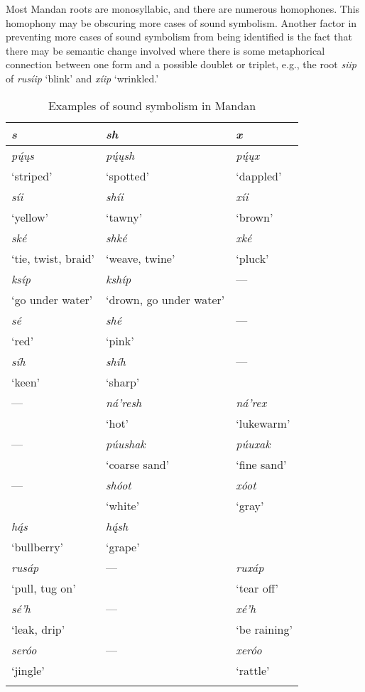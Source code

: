 Most Mandan roots are monosyllabic, and there are numerous homophones. This homophony may be obscuring more cases of sound symbolism. Another factor in preventing more cases of sound symbolism from being identified is the fact that there may be semantic change involved where there is some metaphorical connection between one form and a possible doublet or triplet, e.g., the root \textit{siip} of \textit{rusíip}  `blink' and \textit{xíip} `wrinkled.'

\begin{table}
\caption{Examples of sound symbolism in Mandan}\label{soundsymbolismtable}
\begin{tabular}{lll}
\lsptoprule
\textit{\textbf{s}}&\textit{\textbf{sh}}&\textit{\textbf{x}}\\
\midrule
\textit{pų́ųs}&\textit{pų́ųsh}&\textit{pų́ųx}\\
`striped'&`spotted'&`dappled'\\
\tablevspace
\textit{síi}&\textit{shíi}&\textit{xíi}\\
`yellow'&`tawny'&`brown'\\
\tablevspace
\textit{ské}&\textit{shké}&\textit{xké}\\
`tie, twist, braid'&`weave, twine'&`pluck'\\
\tablevspace
\textit{ksíp}&\textit{kshíp}&---\\
`go under water'&`drown, go under water'&~\\
\tablevspace
\textit{sé}&\textit{shé}&---\\
`red'&`pink'&~\\
\tablevspace
\textit{síh}&\textit{shíh}&---\\
`keen'&`sharp'&~\\
\tablevspace
---&\textit{ná'resh}&\textit{ná'rex}\\
~&`hot'&`lukewarm'\\
\tablevspace
---&\textit{púushak}&\textit{púuxak}\\
~&`coarse sand'&`fine sand'\\
\tablevspace
---&\textit{shóot}&\textit{xóot}\\
~&`white'&`gray'\\
\tablevspace
\textit{hą́s}&\textit{hą́sh}&~\\
`bullberry'&`grape'&~\\
\tablevspace
\textit{rusáp}&---&\textit{ruxáp}\\
`pull, tug on'&~&`tear off'\\
\tablevspace
\textit{sé'h}&---&\textit{xé'h}\\
`leak, drip'&~&`be raining'\\
\tablevspace
\textit{seróo}&---&\textit{xeróo}\\
`jingle'&~&`rattle'\\
\lspbottomrule
\end{tabular}
\end{table}


